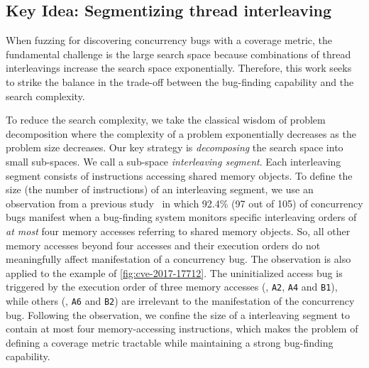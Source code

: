 \subsection{Key Idea: Segmentizing thread interleaving}
\label{ss:overview}


When fuzzing for discovering concurrency bugs with a coverage metric,
the fundamental challenge is the large search space because
combinations of thread interleavings increase the search space
exponentially.
%
Therefore, this work seeks to strike the balance in the trade-off
between the bug-finding capability and the search complexity.

%
To reduce the search complexity, we take the classical wisdom of
problem decomposition where the complexity of a problem exponentially
decreases as the problem size decreases.
%
Our key strategy is \textit{decomposing} the search space into small
sub-spaces. We call a sub-space \textit{interleaving segment}.
%
Each interleaving segment consists of instructions accessing 
shared memory objects.
To define the size (the number of instructions) of an interleaving segment,
we use an observation from a previous study~\cite{learningfrommistakes} 
in which 92.4\% (97 out of 105) of concurrency bugs manifest when a bug-finding system
monitors specific interleaving orders of \textit{at most} four memory
accesses referring to shared memory objects.
%
So, all other memory accesses beyond four accesses and their execution
orders do not meaningfully affect manifestation of a concurrency bug.
%
The observation is also applied to the example of
\autoref{fig:cve-2017-17712}. The uninitialized access bug is
triggered by the execution order of three memory accesses (\eg,
\texttt{A2}, \texttt{A4} and \texttt{B1}), while others (\eg,
\texttt{A6} and \texttt{B2}) are irrelevant to the manifestation of
the concurrency bug.
Following the observation,  we confine the size of a interleaving segment 
to contain at most four memory-accessing instructions,
which makes the problem of defining a coverage metric tractable while maintaining a strong bug-finding capability.


